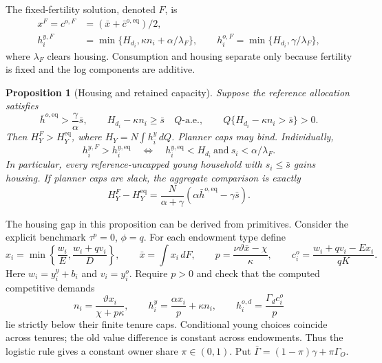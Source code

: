 \documentclass[11pt]{article}
\newtheorem{proposition}{Proposition}
\newcommand{\dd}{\,d}
\newcommand{\eq}{\mathrm{eq}}
\newcommand{\tht}{\vartheta}
\begin{document}
The fixed-fertility solution, denoted $F$, is
\begin{align}
 x^F=c^{o,F}&=(\bar x+\bar c^{o,\eq})/2,\nonumber\\
 h_i^{y,F}&=\min\{H_{d_i},\kappa n_i+\alpha/\lambda_F\},\qquad
 h_i^{o,F}=\min\{H_{d_i},\gamma/\lambda_F\},\label{eq:plannerFsol}
\end{align}
where $\lambda_F$ clears housing. Consumption and housing separate only because fertility is fixed and the log components are additive.

\begin{proposition}[Housing and retained capacity]\label{prop:resource}
Suppose the reference allocation satisfies
\begin{equation}
 \bar h^{o,\eq}>\frac\gamma\alpha\bar s,\qquad
 H_{d_i}-\kappa n_i\ge\bar s\quad Q\text{-a.e.},\qquad
 Q\{H_{d_i}-\kappa n_i>\bar s\}>0.\label{eq:CF}
\end{equation}
Then $H_Y^F>H_Y^{\eq}$, where $H_Y=N\int h_i^y\dd Q$. Planner caps may bind. Individually,
\begin{equation}
 h_i^{y,F}>h_i^{y,\eq}
 \quad\Longleftrightarrow\quad
 h_i^{y,\eq}<H_{d_i}\ \text{and}\ s_i<\alpha/\lambda_F.\label{eq:individual}
\end{equation}
In particular, every reference-uncapped young household with $s_i\le\bar s$ gains housing. If planner caps are slack, the aggregate comparison is exactly
\begin{equation}
 H_Y^F-H_Y^{\eq}=\frac{N}{\alpha+\gamma}
       (\alpha\bar h^{o,\eq}-\gamma\bar s).\label{eq:adultgap}
\end{equation}
\end{proposition}

The housing gap in this proposition can be derived from primitives. Consider the explicit benchmark $\tau^p=0$, $\phi=q$. For each endowment type define
\begin{equation}
 x_i=\min\left\{\frac{w_i}{E},\frac{w_i+qv_i}{D}\right\},\qquad
 \bar x=\int x_i\dd F,\qquad
 p=\frac{\nu\tht\bar x-\chi}{\kappa},\qquad
 c_i^o=\frac{w_i+qv_i-Ex_i}{qK}.\label{eq:explicit}
\end{equation}
Here $w_i=y_i^y+b_i$ and $v_i=y_i^o$. Require $p>0$ and check that the computed competitive demands
\[
 n_i=\frac{\tht x_i}{\chi+p\kappa},\qquad
 h_i^y=\frac{\alpha x_i}{p}+\kappa n_i,\qquad
 h_i^{o,d}=\frac{\Gamma_dc_i^o}{p}
\]
lie strictly below their finite tenure caps. Conditional young choices coincide across tenures; the old value difference is constant across endowments. Thus the logistic rule gives a constant owner share $\pi\in(0,1)$. Put $\bar\Gamma=(1-\pi)\gamma+\pi\Gamma_O$.
\end{document}
